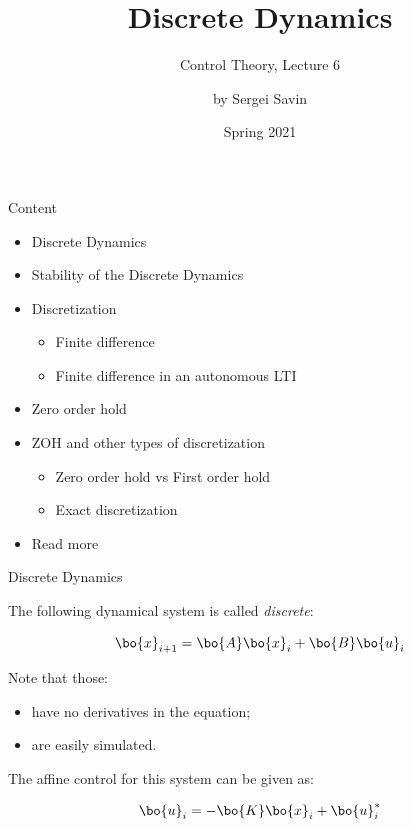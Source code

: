 \documentclass{beamer}
\title{Discrete Dynamics}
\subtitle{Control Theory, Lecture 6}
\author{by Sergei Savin}
\date{Spring 2021}
\begin{document}
\maketitle


\begin{frame}{Content}

\begin{itemize}
\item Discrete Dynamics
\item Stability of the Discrete Dynamics
\item Discretization
\begin{itemize}
    \item Finite difference
    \item Finite difference in an autonomous LTI
\end{itemize}
\item Zero order hold
\item ZOH and other types of discretization
\begin{itemize}
    \item Zero order hold vs First order hold
    \item Exact discretization
\end{itemize}
\item Read more
\end{itemize}

\end{frame}





\begin{frame}{Discrete Dynamics}
\begin{flushleft}

The following dynamical system is called \emph{discrete}:

\begin{equation}
    \bo{x}_{i+1} = \bo{A}\bo{x}_i + \bo{B}\bo{u}_i
\end{equation}

Note that those:

\begin{itemize}
    \item have no derivatives in the equation;
    \item are easily simulated.
\end{itemize}

\bigskip

The affine control for this system can be given as:

\begin{equation}
    \bo{u}_i = -\bo{K}\bo{x}_i + \bo{u}_i^*
\end{equation}

\end{flushleft}
\end{frame}
\end{document}
